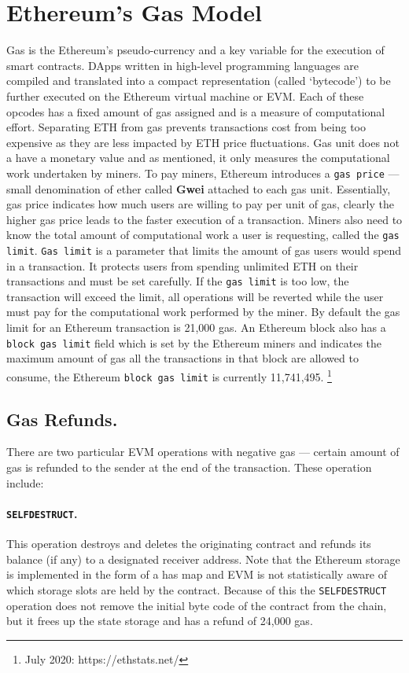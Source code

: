 
\section{Ethereum's Gas Model} 

Gas is the Ethereum's pseudo-currency and a key variable for the execution of smart contracts. DApps written in high-level programming languages are compiled and translated into a compact representation (called ‘bytecode’) to be further executed on the Ethereum virtual machine or EVM. Each of these opcodes has a fixed amount of gas assigned and is a measure of computational effort. Separating ETH from gas prevents transactions cost from being too expensive as they are less impacted by ETH price fluctuations. Gas unit does not a have a monetary value and as mentioned, it only  measures the computational work undertaken by miners. To pay miners, Ethereum introduces a \texttt{gas price} --- small denomination of ether called \textbf{Gwei} attached to each gas unit. Essentially, gas price indicates how much users are willing to pay per unit of gas, clearly the higher gas price leads to the faster execution of a transaction. Miners also need to know the total amount of computational work a user is requesting, called the \texttt{gas limit}. \texttt{Gas limit} is a parameter that limits the amount of gas users would spend in a transaction. It protects users from spending unlimited ETH on their transactions and must be set carefully. If the \texttt{gas limit} is too low, the transaction will exceed the limit, all operations will be reverted while the user must pay for the computational work performed by the miner. By default the gas limit for an Ethereum transaction is 21,000 gas. An Ethereum block also has a \texttt{block gas limit} field which is set by the Ethereum miners and indicates the maximum amount of gas all the transactions in that block are allowed to consume, the Ethereum \texttt{block gas limit} is currently 11,741,495. \footnote{July 2020: https://ethstats.net/} 


\subsection*{Gas Refunds.}There are two particular EVM operations with negative gas --- certain amount of gas is refunded to the sender at the end of the transaction. These operation include:

\paragraph{\texttt{SELFDESTRUCT}.}This operation destroys and deletes the originating contract and refunds its balance (if any) to a designated receiver address. Note that the Ethereum storage is implemented in the form of a has map and EVM is not statistically aware of which storage slots are held by the contract. Because of this the \texttt{SELFDESTRUCT} operation does not remove the initial byte code of the contract from the chain, but it frees up the state storage and has a refund of 24,000 gas.

